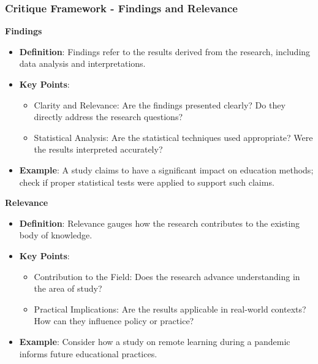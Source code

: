 \documentclass[aspectratio=169]{beamer}
\begin{document}
\begin{frame}[fragile]
    \frametitle{Critique Framework - Findings and Relevance}
    \textbf{Findings}
    \begin{itemize}
        \item \textbf{Definition}: Findings refer to the results derived from the research, including data analysis and interpretations.
        \item \textbf{Key Points}:
            \begin{itemize}
                \item Clarity and Relevance: Are the findings presented clearly? Do they directly address the research questions?
                \item Statistical Analysis: Are the statistical techniques used appropriate? Were the results interpreted accurately?
            \end{itemize}
        \item \textbf{Example}: A study claims to have a significant impact on education methods; check if proper statistical tests were applied to support such claims.
    \end{itemize}

    \textbf{Relevance}
    \begin{itemize}
        \item \textbf{Definition}: Relevance gauges how the research contributes to the existing body of knowledge.
        \item \textbf{Key Points}:
            \begin{itemize}
                \item Contribution to the Field: Does the research advance understanding in the area of study?
                \item Practical Implications: Are the results applicable in real-world contexts? How can they influence policy or practice?
            \end{itemize}
        \item \textbf{Example}: Consider how a study on remote learning during a pandemic informs future educational practices.
    \end{itemize}
\end{frame}
\end{document}
